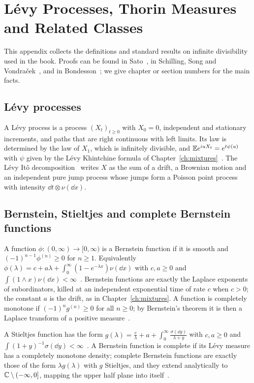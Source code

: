 \chapter{L\'evy Processes, Thorin Measures and Related Classes}
\label{app:levy}

This appendix collects the definitions and standard results on infinite divisibility used in the book. Proofs can be found in Sato~\cite{sato1999}, in Schilling, Song and Vondra\v{c}ek~\cite{schilling2012}, and in Bondesson~\cite{bondesson1992}; we give chapter or section numbers for the main facts.

\section{L\'evy processes}

A L\'evy process is a process $(X_t)_{t\geq0}$ with $X_0 = 0$, independent and stationary increments, and paths that are right continuous with left limits. Its law is determined by the law of $X_1$, which is infinitely divisible, and $\mathbb{E} e^{iuX_t} = e^{t\psi(u)}$ with $\psi$ given by the L\'evy Khintchine formula of Chapter~\ref{ch:mixtures}~\cite[Section~8]{sato1999}. The L\'evy It\^o decomposition~\cite[Chapter 4]{sato1999} writes $X$ as the sum of a drift, a Brownian motion and an independent pure jump process whose jumps form a Poisson point process with intensity $\dd t\otimes\nu(\dd x)$.

\section{Bernstein, Stieltjes and complete Bernstein functions}

A function $\phi:(0,\infty)\to[0,\infty)$ is a Bernstein function if it is smooth and $(-1)^{n-1}\phi^{(n)}\geq0$ for $n\geq1$. Equivalently $\phi(\lambda) = c+a\lambda+\int_0^\infty(1-e^{-\lambda x})\nu(\dd x)$ with $c,a\geq0$ and $\int(1\wedge x)\nu(\dd x)<\infty$~\cite[Chapter 3]{schilling2012}. Bernstein functions are exactly the Laplace exponents of subordinators, killed at an independent exponential time of rate $c$ when $c>0$; the constant $a$ is the drift, as in Chapter~\ref{ch:mixtures}. A function is completely monotone if $(-1)^ng^{(n)}\geq0$ for all $n\geq0$; by Bernstein's theorem it is then a Laplace transform of a positive measure~\cite[Chapter 1]{schilling2012}.

A Stieltjes function has the form $g(\lambda) = \frac c\lambda+a+\int_0^\infty\frac{\sigma(\dd y)}{\lambda+y}$ with $c,a\geq0$ and $\int(1+y)^{-1}\sigma(\dd y)<\infty$~\cite[Chapter 2]{schilling2012}. A Bernstein function is complete if its L\'evy measure has a completely monotone density; complete Bernstein functions are exactly those of the form $\lambda g(\lambda)$ with $g$ Stieltjes, and they extend analytically to $\mathbb{C}\setminus(-\infty,0]$, mapping the upper half plane into itself~\cite[Chapters 6 and 7]{schilling2012}.

